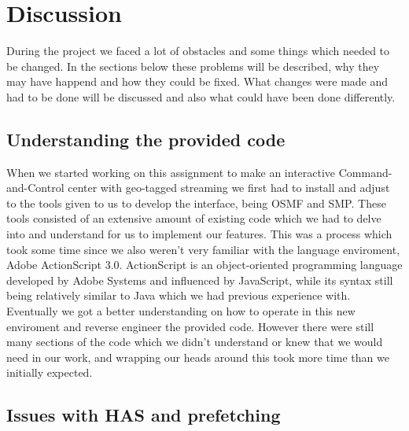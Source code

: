 \chapter{Discussion}
\label{cha:discussion}


During the project we faced a lot of obstacles and some things which needed to be changed. In the sections below these problems will be described, why they may have happend and how they could be fixed. What changes were made and had to be done will be discussed and also what could have been done differently.


\section{Understanding the provided code}
\label{sec:understandingcode}

When we started working on this assignment to make an interactive Command-and-Control center with geo-tagged streaming we first had to install and adjust to the tools given to us to develop the interface, being OSMF and SMP. These tools consisted of an extensive amount of existing code which we had to delve into and understand for us to implement our features.
This was a process which took some time since we also weren’t very familiar with the language enviroment, Adobe ActionScript 3.0. ActionScript is an object-oriented programming language developed by Adobe Systems and influenced by JavaScript, while its syntax still being relatively similar to Java which we had previous experience with. Eventually we got a better understanding on how to operate in this new enviroment and reverse engineer the provided code. However there were still many sections of the code which we didn’t understand or knew that we would need in our work, and wrapping our heads around this took more time than we initially expected. 

\section{Issues with HAS and prefetching}
\label{sec:hasissues}

